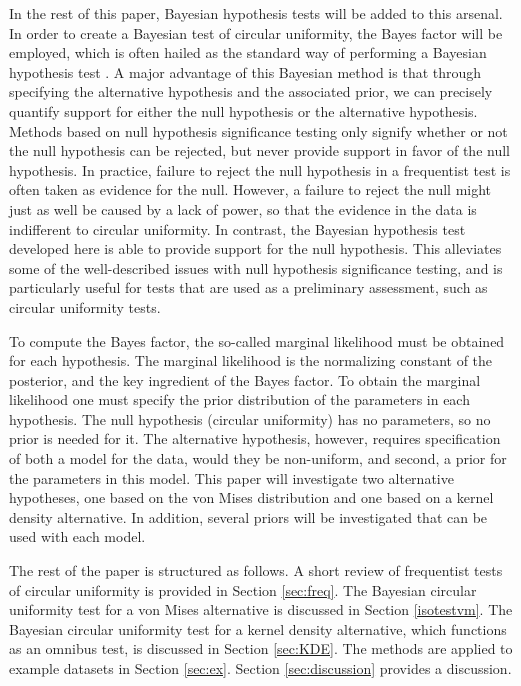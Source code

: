 In the rest of this paper, Bayesian hypothesis tests will be added to this arsenal. In order to create a Bayesian test of circular uniformity, the Bayes factor will be employed, which is often hailed as the standard way of performing a Bayesian hypothesis test \citep{kass1995bayes, jeffreys1961theory}. A major advantage of this Bayesian method is that through  specifying the alternative hypothesis and the associated prior, we can precisely quantify support for either the null hypothesis or the alternative hypothesis. Methods based on null hypothesis significance testing only signify whether or not the null hypothesis can be rejected, but never provide support in favor of the null hypothesis. In practice, failure to reject the null hypothesis in a frequentist test is often taken as evidence for the null. However, a failure to reject the null might just as well be caused by a lack of power, so that the evidence in the data is indifferent to circular uniformity. In contrast, the Bayesian hypothesis test developed here is able to provide support for the null hypothesis. This alleviates some of the well-described issues with null hypothesis significance testing, and is particularly useful for tests that are used as a preliminary assessment, such as circular uniformity tests. 

 To compute the Bayes factor, the so-called marginal likelihood must be obtained for each hypothesis. The marginal likelihood is the normalizing constant of the posterior, and the key ingredient of the Bayes factor. To obtain the marginal likelihood one must specify the prior distribution of the parameters in each hypothesis. The null hypothesis (circular uniformity) has no parameters, so no prior is needed for it. The alternative hypothesis, however, requires specification of both a model for the data, would they be non-uniform, and second, a prior for the parameters in this model. This paper will investigate two alternative hypotheses, one based on the von Mises distribution and one based on a kernel density alternative. In addition, several priors will be investigated that can be used with each model.  

The rest of the paper is structured as follows. A short review of frequentist tests of circular uniformity is provided in Section \ref{sec:freq}. The Bayesian circular uniformity test for a von Mises alternative is discussed in Section \ref{isotestvm}. The Bayesian circular uniformity test for a kernel density alternative, which functions as an omnibus test, is discussed in Section \ref{sec:KDE}. The methods are applied to example datasets in Section \ref{sec:ex}. Section \ref{sec:discussion} provides a discussion.

